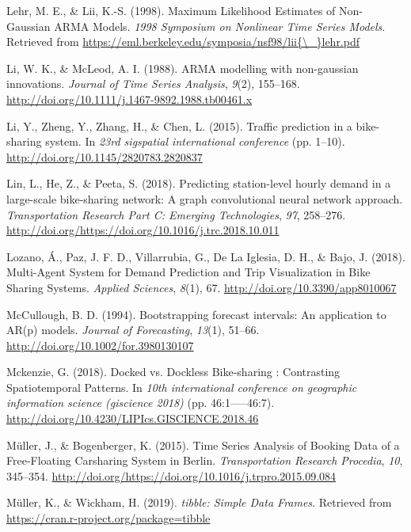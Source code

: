 \documentclass[12pt,oneside]{reedthesis}
\begin{document}
\hypertarget{ref-lehr1998}{}
Lehr, M. E., \& Lii, K.-S. (1998). Maximum Likelihood Estimates of
Non-Gaussian ARMA Models. \emph{1998 Symposium on Nonlinear Time Series
Models}. Retrieved from
\href{https://eml.berkeley.edu/symposia/nsf98/lii\%7B/_\%7Dlehr.pdf}{https://eml.berkeley.edu/symposia/nsf98/lii\{\textbackslash{}\_\}lehr.pdf}

\hypertarget{ref-li1988}{}
Li, W. K., \& McLeod, A. I. (1988). ARMA modelling with non-gaussian
innovations. \emph{Journal of Time Series Analysis}, \emph{9}(2),
155--168. \url{http://doi.org/10.1111/j.1467-9892.1988.tb00461.x}

\hypertarget{ref-li2015}{}
Li, Y., Zheng, Y., Zhang, H., \& Chen, L. (2015). Traffic prediction in
a bike-sharing system. In \emph{23rd sigspatial international
conference} (pp. 1--10). \url{http://doi.org/10.1145/2820783.2820837}

\hypertarget{ref-lin2018}{}
Lin, L., He, Z., \& Peeta, S. (2018). Predicting station-level hourly
demand in a large-scale bike-sharing network: A graph convolutional
neural network approach. \emph{Transportation Research Part C: Emerging
Technologies}, \emph{97}, 258--276.
\url{http://doi.org/https://doi.org/10.1016/j.trc.2018.10.011}

\hypertarget{ref-lozano2018}{}
Lozano, Á., Paz, J. F. D., Villarrubia, G., De La Iglesia, D. H., \&
Bajo, J. (2018). Multi-Agent System for Demand Prediction and Trip
Visualization in Bike Sharing Systems. \emph{Applied Sciences},
\emph{8}(1), 67. \url{http://doi.org/10.3390/app8010067}

\hypertarget{ref-mccullough1994}{}
McCullough, B. D. (1994). Bootstrapping forecast intervals: An
application to AR(p) models. \emph{Journal of Forecasting},
\emph{13}(1), 51--66. \url{http://doi.org/10.1002/for.3980130107}

\hypertarget{ref-mckenzie2018}{}
Mckenzie, G. (2018). Docked vs. Dockless Bike-sharing : Contrasting
Spatiotemporal Patterns. In \emph{10th international conference on
geographic information science (giscience 2018)} (pp. 46:1-----46:7).
\url{http://doi.org/10.4230/LIPIcs.GISCIENCE.2018.46}

\hypertarget{ref-muller2015}{}
Müller, J., \& Bogenberger, K. (2015). Time Series Analysis of Booking
Data of a Free-Floating Carsharing System in Berlin.
\emph{Transportation Research Procedia}, \emph{10}, 345--354.
\url{http://doi.org/https://doi.org/10.1016/j.trpro.2015.09.084}

\hypertarget{ref-tibble}{}
Müller, K., \& Wickham, H. (2019). \emph{tibble: Simple Data Frames}.
Retrieved from \url{https://cran.r-project.org/package=tibble}
\end{document}
